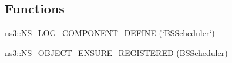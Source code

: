 \subsection*{Functions}
\begin{DoxyCompactItemize}
\item 
\hyperlink{namespacens3_a0daf3594618bd725ae69da467218d096}{ns3\+::\+N\+S\+\_\+\+L\+O\+G\+\_\+\+C\+O\+M\+P\+O\+N\+E\+N\+T\+\_\+\+D\+E\+F\+I\+NE} (\char`\"{}B\+S\+Scheduler\char`\"{})
\item 
\hyperlink{namespacens3_a9bbbf469c6b299f7118feffeb868e4f6}{ns3\+::\+N\+S\+\_\+\+O\+B\+J\+E\+C\+T\+\_\+\+E\+N\+S\+U\+R\+E\+\_\+\+R\+E\+G\+I\+S\+T\+E\+R\+ED} (B\+S\+Scheduler)
\end{DoxyCompactItemize}
